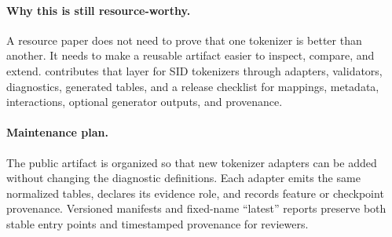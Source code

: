 \paragraph{Why this is still resource-worthy.}
A resource paper does not need to prove that one tokenizer is better than
another. It needs to make a reusable artifact easier to inspect, compare, and
extend. \tool contributes that layer for SID tokenizers through adapters,
validators, diagnostics, generated tables, and a release checklist for mappings,
metadata, interactions, optional generator outputs, and provenance.

\paragraph{Maintenance plan.}
The public artifact is organized so that new tokenizer adapters can be added
without changing the diagnostic definitions. Each adapter emits the same
normalized tables, declares its evidence role, and records feature or checkpoint
provenance. Versioned manifests and fixed-name ``latest'' reports preserve both
stable entry points and timestamped provenance for reviewers.
